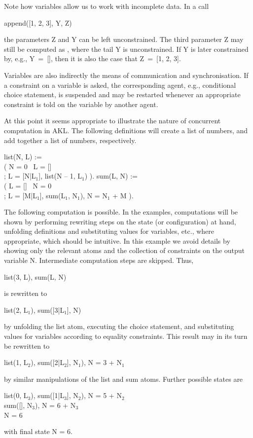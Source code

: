 Note how variables allow us to work with incomplete data.  In a call
%
\begin{progex}
append([1, 2, 3], Y, Z)
\end{progex}%
%
the parameters {\prog Z} and {\prog Y} can be left unconstrained.  The
third parameter {\prog Z} may still be computed as {\prog [1, 2,
3|Y]}, where the tail {\prog Y} is unconstrained.  If {\prog Y} is
later constrained by, e.g., {\prog Y~=~[]}, then it is also the case
that {\prog Z~=~[1, 2, 3]}.

Variables are also indirectly the means of communication and
synchronisation.  If a constraint on a variable is asked, the
corresponding agent, e.g., conditional choice statement, is suspended
and may be restarted whenever an appropriate constraint is told on the
variable by another agent.

At this point it seems appropriate to illustrate the nature of
concurrent computation in AKL.  The following definitions will create a
list of numbers, and add together a list of numbers, respectively.
%
\begin{program}
list(N, L) := \\
\>\>( N = 0 \cond\ L = [] \\
\>\>; L = [N|L$_1$], list(N -- 1, L$_1$) ).  \nl
sum(L, N) := \\
\>\>( L = [] \cond\ N = 0 \\
\>\>; L = [M|L$_1$], sum(L$_1$, N$_1$), N = N$_1$ + M ).
\end{program}%
%
The following computation is possible.  In the examples, computations
will be shown by performing rewriting steps on the state (or
configuration) at hand, unfolding definitions and substituting values
for variables, etc., where appropriate, which should be intuitive.  In
this example we avoid details by showing only the relevant atoms and
the collection of constraints on the output variable {\prog N}.
Intermediate computation steps are skipped.  Thus,
%
\begin{progex}
list(3, L), sum(L, N)
\end{progex}%
%
is rewritten to
%
\begin{progex}
list(2, L$_1$), sum([3|L$_1$], N)
\end{progex}%
%
by unfolding the {\prog list} atom, executing the choice statement,
and substituting values for variables according to equality
constraints.  This result may in its turn be rewritten to
%
\begin{progex}
list(1, L$_2$), sum([2|L$_2$], N$_1$), N = 3 + N$_1$
\end{progex}%
%
by similar manipulations of the {\prog list} and {\prog sum} atoms.
Further possible states are
%
\begin{progex}
list(0, L$_3$), sum([1|L$_3$], N$_2$), N = 5 + N$_2$ \\
sum([], N$_3$), N = 6 + N$_3$ \\
N = 6
\end{progex}%
%
with final state N = 6.

